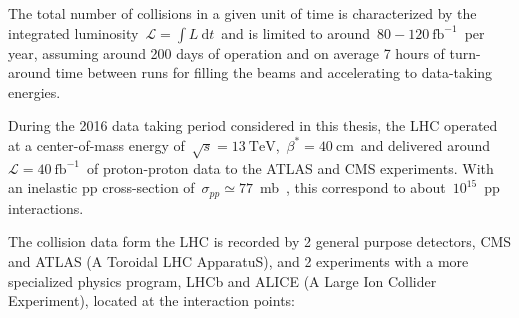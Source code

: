 The total number of collisions in a given unit of time is characterized by the integrated luminosity~$\mathcal{L} = \int L\ \mathrm{d}t$~and is limited to around~$80-120~\mathrm{fb}^{-1}$~per year, assuming around 200 days of operation and on average 7 hours of turn-around time between runs for filling the beams and accelerating to data-taking energies.

During the 2016 data taking period considered in this thesis, the LHC operated at a center-of-mass energy of~$\sqrt{s} = 13~\mathrm{TeV}$,~$\beta^* = 40~\mathrm{cm}$~and delivered around~$\mathcal{L} = 40~\mathrm{fb}^{-1}$~of proton-proton data to the ATLAS and CMS experiments. With an inelastic pp cross-section of~$\sigma_{pp} \simeq 77$~mb~\cite{VanHaevermaet:2016gnh}, this correspond to about~$10^{15}$~pp interactions.

The collision data form the LHC is recorded by 2 general purpose detectors, CMS and ATLAS (A Toroidal LHC ApparatuS), and 2 experiments with a more specialized physics program, LHCb and ALICE (A Large Ion Collider Experiment), located at the interaction points:

